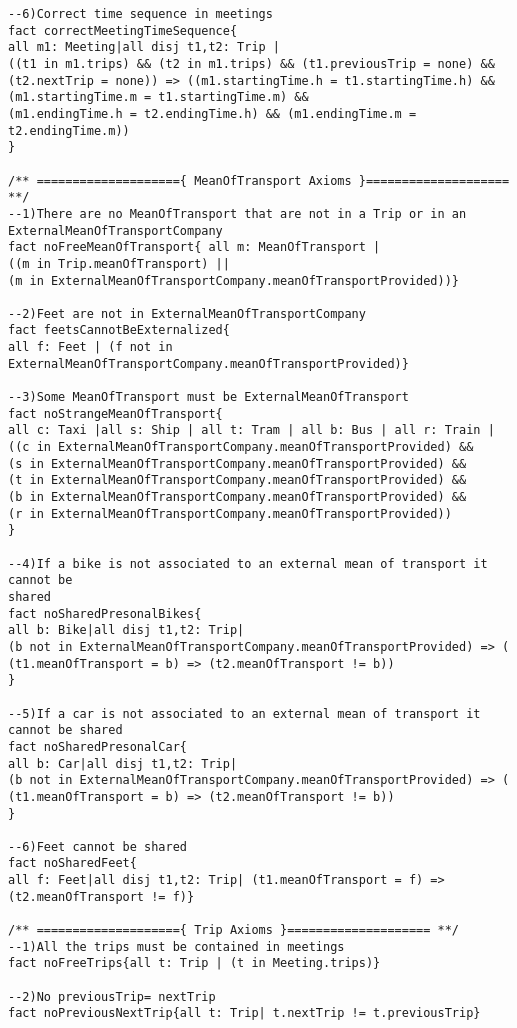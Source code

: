 \documentclass[a4paper,leqno]{book}
\begin{document}
\begin{lstlisting}
--6)Correct time sequence in meetings
fact correctMeetingTimeSequence{
all m1: Meeting|all disj t1,t2: Trip |
((t1 in m1.trips) && (t2 in m1.trips) && (t1.previousTrip = none) &&
(t2.nextTrip = none)) => ((m1.startingTime.h = t1.startingTime.h) && 
(m1.startingTime.m = t1.startingTime.m) && 
(m1.endingTime.h = t2.endingTime.h) && (m1.endingTime.m = t2.endingTime.m))
}

/** ===================={ MeanOfTransport Axioms }==================== **/
--1)There are no MeanOfTransport that are not in a Trip or in an 
ExternalMeanOfTransportCompany
fact noFreeMeanOfTransport{ all m: MeanOfTransport |
((m in Trip.meanOfTransport) || 
(m in ExternalMeanOfTransportCompany.meanOfTransportProvided))}

--2)Feet are not in ExternalMeanOfTransportCompany
fact feetsCannotBeExternalized{
all f: Feet | (f not in ExternalMeanOfTransportCompany.meanOfTransportProvided)}

--3)Some MeanOfTransport must be ExternalMeanOfTransport
fact noStrangeMeanOfTransport{
all c: Taxi |all s: Ship | all t: Tram | all b: Bus | all r: Train |
((c in ExternalMeanOfTransportCompany.meanOfTransportProvided) &&
(s in ExternalMeanOfTransportCompany.meanOfTransportProvided) &&
(t in ExternalMeanOfTransportCompany.meanOfTransportProvided) &&
(b in ExternalMeanOfTransportCompany.meanOfTransportProvided) &&
(r in ExternalMeanOfTransportCompany.meanOfTransportProvided))
}

--4)If a bike is not associated to an external mean of transport it cannot be
shared
fact noSharedPresonalBikes{
all b: Bike|all disj t1,t2: Trip|
(b not in ExternalMeanOfTransportCompany.meanOfTransportProvided) => (
(t1.meanOfTransport = b) => (t2.meanOfTransport != b))
}

--5)If a car is not associated to an external mean of transport it cannot be shared
fact noSharedPresonalCar{
all b: Car|all disj t1,t2: Trip|
(b not in ExternalMeanOfTransportCompany.meanOfTransportProvided) => (
(t1.meanOfTransport = b) => (t2.meanOfTransport != b))
}

--6)Feet cannot be shared
fact noSharedFeet{
all f: Feet|all disj t1,t2: Trip| (t1.meanOfTransport = f) => 
(t2.meanOfTransport != f)}

/** ===================={ Trip Axioms }==================== **/
--1)All the trips must be contained in meetings
fact noFreeTrips{all t: Trip | (t in Meeting.trips)}

--2)No previousTrip= nextTrip
fact noPreviousNextTrip{all t: Trip| t.nextTrip != t.previousTrip}


\end{lstlisting}
\end{document}
